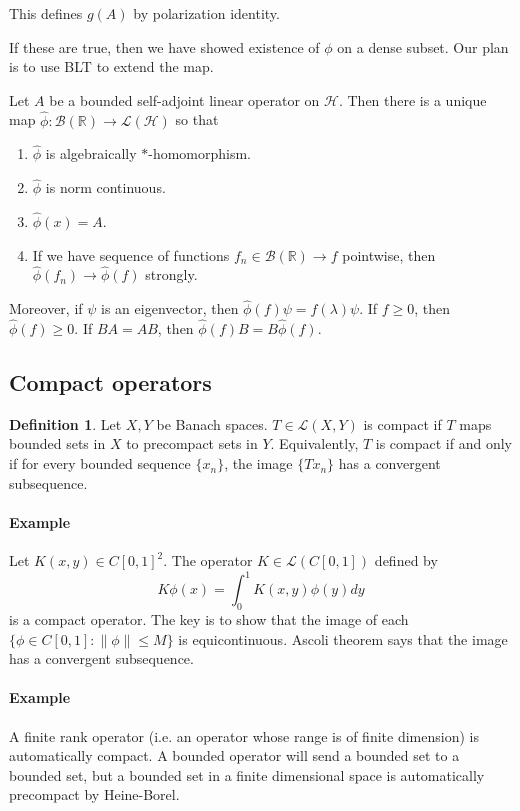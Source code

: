 \documentclass[12pt]{article}
\theoremstyle{plain}
\theoremstyle{definition}
\newtheorem{definition}[equation]{Definition}
\theoremstyle{named}
\newcommand{\shB}{\mathscr{B}}
\newcommand{\shH}{\mathscr{H}}
\newcommand{\shL}{\mathscr{L}}
\newcommand{\<}{\langle}
\renewcommand{\>}{\rangle}
\def\what{\widehat}
\newcommand{\IR}{\mathbb{R}}
\begin{document}
This defines $g(A)$ by polarization identity. 

If these are true, then we have showed existence of $\phi$ on a dense subset. Our plan is to use BLT to extend the map.  


Let $A$ be a bounded self-adjoint linear operator on $\shH$. Then there is a unique map $\what{\phi} : \shB(\IR) \to \shL(\shH)$ so that 
\begin{enumerate}
\item $\what{\phi}$ is algebraically $*$-homomorphism. 
\item $\what{\phi}$ is norm continuous. 
\item $\what{\phi}(x) = A$. 
\item If we have sequence of functions $f_n \in \shB(\IR) \to f$ pointwise, then $ \what{\phi}(f_n) \to \what{\phi}(f) $ strongly. 
\end{enumerate}
Moreover, if $\psi$ is an eigenvector, then $\what{\phi}(f) \psi = f(\lambda) \psi$. If $f \ge 0$, then $\what{\phi}(f) \ge 0$. If $BA = AB$, then $\what{\phi}(f) B = B \what{\phi}(f)$. 

\subsection{Compact operators}

\begin{definition}
Let $X, Y$ be Banach spaces. $T \in \shL(X, Y)$ is compact if $T$ maps bounded sets in $X$ to precompact sets in $Y$. Equivalently, $T$ is compact if and only if for every bounded sequence $\{ x_n \}$, the image $\{ Tx_n \}$ has a convergent subsequence. 
\end{definition}

\paragraph{Example} Let $K(x, y) \in C[0, 1]^2$. The operator $K \in \shL(C[0, 1])$ defined by
$$ K \phi(x) = \int_0^1 K(x, y) \phi(y) dy $$ 
is a compact operator. The key is to show that the image of each $\{ \phi \in C[0, 1] : \| \phi \| \le M\}$ is equicontinuous. Ascoli theorem says that the image has a convergent subsequence.  

\paragraph{Example} A finite rank operator (i.e. an operator whose range is of finite dimension) is automatically compact. A bounded operator will send a bounded set to a bounded set, but a bounded set in a finite dimensional space is automatically precompact by Heine-Borel. 
\end{document}
